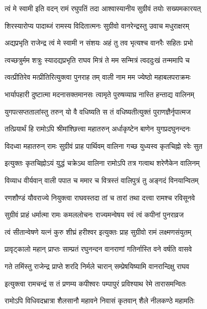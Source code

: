 \twolineshloka
{त्वं मे स्वामी इति वदन् रामं रघुपतिं तदा}
{आश्वास्यानीय सुग्रीवं तयोः सख्यमकारयत्} %

\twolineshloka
{शिरस्यारोप्य पादाब्जं रामस्य विदितात्मनः}
{सुग्रीवो वानरेन्द्रस्तु उवाच मधुराक्षरम्} %

\twolineshloka
{अद्यप्रभृति राजेन्द्र त्वं मे स्वामी न संशयः}
{अहं तु तव भृत्यश्च वानरैः सहितः प्रभो} %

\twolineshloka
{त्वच्छत्रुर्मम शत्रुः स्यादद्यप्रभृति राघव}
{मित्रं ते मम सन्मित्रं त्वददुःखं तन्ममापि च} %

\twolineshloka
{त्वत्प्रीतिरेव मत्प्रीतिरित्युक्त्वा पुनराह तम्}
{वाली नाम मम ज्येष्ठो महाबलपराक्रमः} %

\twolineshloka
{भार्यापहारी दुष्टात्मा मदनासक्तमानसः}
{त्वामृते पुरुषव्याघ्र नास्ति हन्ताद्य वालिनम्} %

\twolineshloka
{युगपत्सप्ततालांस्तु तरुन् यो वै वधिष्यति}
{स तं वधिष्यतीत्युक्तं पुराणज्ञैर्नृपात्मज} %

\twolineshloka
{तत्प्रियार्थं हि रामोऽपि श्रीमांश्छित्त्वा महातरुन्}
{अर्धाकृष्टेन बाणेन युगप्रदघुनन्दनः} %

\twolineshloka
{विदध्वा महातरुन् रामः सुग्रीवं प्राह पार्थिवम्}
{वालिना गच्छ युध्यस्व कृतचिह्नो रवेः सुत} %

\twolineshloka
{इत्युक्तः कृतचिह्नोऽयं युद्धं चक्रेऽथ वालिना}
{रामोऽपि तत्र गत्वाथ शरेणैकेन वालिनम्} %

\twolineshloka
{विव्याध वीर्यवान् वाली पपात च ममार च}
{वित्रस्तं वालिपुत्रं तु अङ्गदं विनयान्वितम्} %

\twolineshloka
{रणशौण्डं यौवराज्ये नियुक्त्वा राघवस्तदा}
{तां च तारां तथा दत्त्वा रामश्च रविसूनवे} %

\twolineshloka
{सुग्रीवं प्राहं धर्मात्मा रामः कमललोचनः}
{राज्यमन्वेषय स्वं त्वं कपीनां पुनराव्रज} %

\twolineshloka
{त्वं सीतान्वेषणे यत्नं कुरु शीघ्रं हरीश्वर}
{इत्युक्तः प्राह सुग्रीवो रामं लक्ष्मणसंयुतम्} %

\twolineshloka
{प्रावृट्कालो महान् प्राप्तः साम्प्रतं रघुनन्दन}
{वानराणां गतिर्नास्ति वने वर्षति वासवे} %

\twolineshloka
{गते तमिंस्तु राजेन्द्र प्राप्ते शरदि निर्मले}
{चारान् सम्प्रेषयिष्यामि वानरान्दिक्षु राघव} %

\twolineshloka
{इत्युक्त्वा रामचन्द्रं स तं प्रणम्य कपीश्वरः}
{पम्पापुरं प्रविश्याथ रेमे तारासमन्वितः} %

\twolineshloka
{रामोऽपि विधिवदभ्रात्रा शैलसानौ महावने}
{निवासं कृतवान् शैले नीलकण्ठे महामतिः} %

